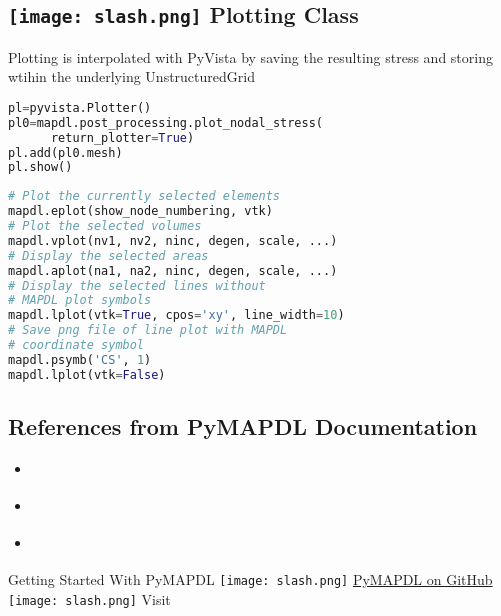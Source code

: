 \documentclass[9pt,landscape]{article}
\begin{document}
\begin{multicols}{3}
\section{\texttt{[image: slash.png]} Plotting Class}
Plotting is interpolated with PyVista by saving the resulting stress and storing wtihin the underlying UnstructuredGrid
\begin{lstlisting}[language=Python]
pl=pyvista.Plotter()
pl0=mapdl.post_processing.plot_nodal_stress(
      return_plotter=True)
pl.add(pl0.mesh)
pl.show()
\end{lstlisting} 
\begin{lstlisting}[language=Python]
# Plot the currently selected elements
mapdl.eplot(show_node_numbering, vtk)
# Plot the selected volumes
mapdl.vplot(nv1, nv2, ninc, degen, scale, ...)
# Display the selected areas
mapdl.aplot(na1, na2, ninc, degen, scale, ...)
# Display the selected lines without 
# MAPDL plot symbols
mapdl.lplot(vtk=True, cpos='xy', line_width=10)
# Save png file of line plot with MAPDL 
# coordinate symbol
mapdl.psymb('CS', 1)
mapdl.lplot(vtk=False)
\end{lstlisting} 
\vfill

\subsection{References from PyMAPDL Documentation}
\begin{itemize}
\item \href{https://mapdldocs.pyansys.com/getting_started/index.html}{\color{blue}{Getting Started}}
\item \href{https://mapdldocs.pyansys.com/mapdl_commands/index.html}{\color{blue}{MAPDL Commands}}
\item \href{https://mapdldocs.pyansys.com/api/index.html}{\color{blue}{API Reference}}
\end{itemize}
\end{multicols}
\vspace{-0.15cm}
\noindent\makebox[\linewidth]{\rule{\paperwidth}{4pt}}
\begin{center}
Getting Started With PyMAPDL \texttt{[image: slash.png]} \href{https://github.com/pyansys/pymapdl}{PyMAPDL on GitHub} \texttt{[image: slash.png]} Visit 
\end{center}
\end{document}

